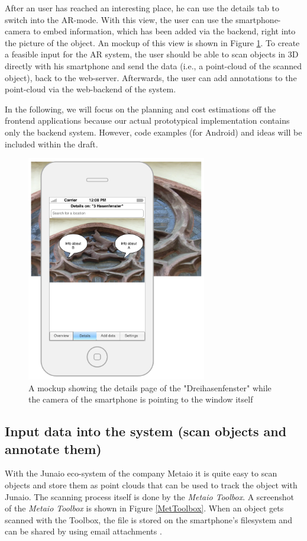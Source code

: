 After an user has reached an interesting place, he can use the details tab to switch into the \ac{AR}-mode. With this view, the user can use the smartphone-camera to embed information, which has been added via the backend, right into the picture of the object. An mockup of this view is shown in Figure \ref{app2}. 
To create a feasible input for the \ac{AR} system, the user should be able to scan objects in 3D directly with his smartphone and send the data (i.e., a point-cloud of the scanned object), back to the web-server.  Afterwards, the user can add annotations to the point-cloud via the web-backend of the system. 

In the following, we will focus on the planning and cost estimations off the frontend applications because our actual prototypical implementation contains only the backend system.  However, code examples (for Android) and ideas will be included within the draft. 

\begin{figure}[th]
	\centerline{\includegraphics[width=0.7\textwidth]{gfx/mockup_app_2}}
	\caption{A mockup showing the details page of the "Dreihasenfenster" while the camera of the smartphone is pointing to the window itself}
	\label{app2}
\end{figure}			
  
\subsection{Input data into the system (scan objects and annotate them)} 
With the Junaio eco-system of the company Metaio it is quite easy to scan objects and store them as point clouds that can be used to track the object with Junaio. The scanning process itself is done by the \emph{Metaio Toolbox}. A screenshot of the \emph{Metaio Toolbox} is shown in Figure \ref{MetToolbox}. When an object gets scanned with the Toolbox, the file is stored on the smartphone's filesystem and can be shared by using email attachments .

